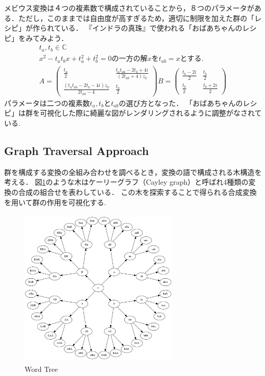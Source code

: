 メビウス変換は４つの複素数で構成されていることから，８つのパラメータがある．ただし，このままでは自由度が高すぎるため，適切に制限を加えた群の「レシピ」が作られている．
『インドラの真珠』で使われる「おばあちゃんのレシピ」をみてみよう．
\begin{eqnarray*}
 t_a, t_b \in \mathbb{C} \\
 x^2 - t_a t_b x + t_a^2 + t_b^2 = 0 \text{の一方の解}x\text{を}t_{ab} = x \text{とする. }\\
 A = \left(
      \begin{array}{ccc}
       \frac{t_a}{2} & \frac{t_a t_{ab} - 2 t_b + 4i}{(2 t_{ab} + 4)z_0} \\
       \frac{(t_a t_{ab} - 2 t_b -4i)z_0}{2 t_{ab} - 4} & \frac{t_a}{2}
      \end{array}
     \right)
 B = \left(
      \begin{array}{ccc}
       \frac{t_b - 2i}{2} & \frac{t_b}{2} \\
       \frac{t_b}{2} & \frac{t_b + 2i}{2}
      \end{array}
     \right)
\end{eqnarray*}
パラメータは二つの複素数$t_a, t_b$と$t_{ab}$の選び方となった．
「おばあちゃんのレシピ」は群を可視化した際に綺麗な図がレンダリングされるように調整がなされている.  

\subsection{Graph Traversal Approach}

群を構成する変換の全組み合わせを調べるとき，変換の語で構成される木構造を考える．
図\ref{fig:wordTree}のような木はケーリーグラフ（Cayley graph）と呼ばれ4種類の変換の合成の組合せを表わしている．
この木を探索することで得られる合成変換を用いて群の作用を可視化する. 

\begin{figure}[htbp]
  \begin{center}
   \includegraphics[width=3in, height=3in, keepaspectratio]{../img/klein/wordTree.pdf}
   \caption{Word Tree}
   \label{fig:wordTree}
  \end{center}
\end{figure}

